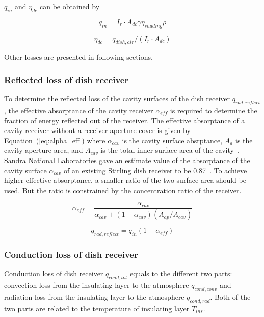 \documentclass{article}
\begin{document}
$q_{in}$ and $\eta_{dc}$ can be obtained by

\begin{equation}
	q_{in}=I_r\cdot A_{dc}\gamma\eta_{shading}\rho
	\label{eq:q_in}
\end{equation}

\begin{equation}
	\eta_{dc}=q_{dish,air}/\left(I_r\cdot A_{dc}\right)
	\label{eq:eta_dc}
\end{equation}

Other losses are presented in following sections.

\subsubsection{Reflected loss of dish receiver}
To determine the reflected loss of the cavity surfaces of the dish receiver $q_{rad,reflect}$, the effective absorptance of the cavity receiver $\alpha_{eff}$ is required to determine the fraction of energy reflected out of the receiver. The effective absorptance of a cavity receiver without a receiver aperture cover is given by Equation~(\ref{eq:alpha_eff}) where $\alpha_{cav}$ is the cavity surface absrptance, $A_a$ is the cavity aperture area, and $A_{cav}$ is the total inner surface area of the cavity~\cite{Duffie2013}. Sandra National Laboratories gave an estimate value of the absorptance of the cavity surface $\alpha_{cav}$ of an existing Stirling dish receiver to be 0.87~\cite{Hogan1994}. To achieve higher effective absorptance, a smaller ratio of the two surface area should be used. But the ratio is constrained by the concentration ratio of the receiver.

\begin{equation}
	\alpha_{eff}=\dfrac{\alpha_{cav}}{\alpha_{cav}+\left(1-\alpha_{cav}\right)\left(A_{ap}/A_{cav}\right)}
	\label{eq:alpha_eff}
\end{equation}

\begin{equation*}
	q_{rad,reflect}=q_{in}(1-\alpha_{eff})
\end{equation*}

\subsubsection{Conduction loss of dish receiver}
Conduction loss of dish receiver $q_{cond,tot}$ equals to the different two parts: convection loss from the insulating layer to the atmosphere $q_{cond,conv}$ and radiation loss from the insulating layer to the atmosphere $q_{cond,rad}$. Both of the two parts are related to the temperature of insulating layer $T_{ins}$.
\end{document}
